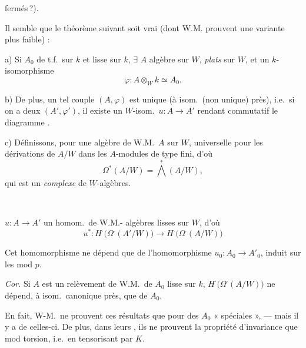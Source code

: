 \documentclass[11pt,a4paper]{article}
\begin{document}

 fermés\,?). 

Il semble que le théorème suivant soit vrai (dont W.M. prouvent une
variante plus faible) :

a) Si $A_0$ de t.f.\ sur $k$ et lisse sur $k$,
$\exists$ $A$  algèbre sur $W$,
\emph{plats} sur $W$, et un $k$-isomorphisme
\[
  \varphi : A \otimes_W k \simeq A_0 .
\]

b) De plus, un tel couple $(A, \varphi)$ est unique (à isom.\ (non
unique) près), i.e.\ si on a deux $(A', \varphi')$, il existe un
$W$-isom.\ $u : A \to A'$ rendant commutatif le diagramme
.

c) Définissons, pour une algèbre de W.M.\ $A$ sur $W$,
 universelle pour les
dérivations de $A/W$ dans les $A$-modules de type fini, d'où
\[
  \Omega^{*}(A/W) = \textstyle\bigwedge^{*}(A/W) ,
\]
 qui est un \emph{complexe}
de $W$-algèbres.

\ 

\struck{\ill{}} $u : A \to A'$ un homom.\ de W.M.- algèbres lisses sur
$W$, d'où
\[
  u^{*} : H^{\cdot}\bigl(\Omega^{\cdot}(A'/W)\bigr) \longrightarrow
  H^{\cdot}\bigl(\Omega^{\cdot}(A/W)\bigr)
\]


Cet homomorphisme ne dépend que de l'homomorphisme
$u_0 : A_0 \to A'_0$, induit sur les  mod $p$.

\emph{Cor.} Si $A$ est un relèvement de W.M.\ de
 $A_0$ lisse sur $k$, 
$H^{\cdot}\bigl(\Omega^{\cdot}(A/W)\bigr)$ ne dépend, à isom.\ canonique
près, que de $A_0$.

En fait, W-M.\ ne prouvent ces résultats que pour des $A_0$
« spéciales », --- mais il y a  de celles-ci. De plus,
dans leurs , ils ne prouvent la propriété d'invariance
\ill{} que mod torsion, i.e.\ en tensorisant par $K$.
\end{document}
